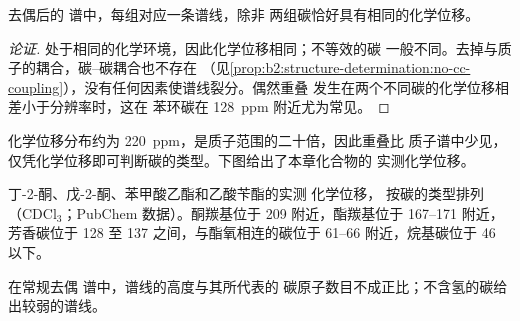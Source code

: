 \begin{proposition}[谱线数目]\label{prop:b2:structure-determination:signals}
去偶后的  谱中，每组对应一条谱线，除非
两组碳恰好具有相同的化学位移。
\end{proposition}

\begin{proof}[论证]
处于相同的化学环境，因此化学位移相同；不等效的碳
一般不同。去掉与质子的耦合，碳–碳耦合也不存在
（见\cref{prop:b2:structure-determination:no-cc-coupling}），没有任何因素使谱线裂分。偶然重叠
发生在两个不同碳的化学位移相差小于分辨率时，这在
苯环碳在 \qty{128}{ppm} 附近尤为常见。
\end{proof}

化学位移分布约为 \qty{220}{ppm}，是质子范围的二十倍，因此重叠比
质子谱中少见，仅凭化学位移即可判断碳的类型。下图给出了本章化合物的
实测化学位移。

\begin{omfigure}

{\small 丁-2-酮、戊-2-酮、苯甲酸乙酯和乙酸苄酯的实测  化学位移，
按碳的类型排列（CDCl$_3$；PubChem 数据）。酮羰基位于 209 附近，酯羰基位于
167--171 附近，芳香碳位于 128 至 137 之间，与酯氧相连的碳位于
61--66 附近，烷基碳位于 46 以下。}
\end{omfigure}

\begin{proposition}[谱线高度不代表计数]\label{prop:b2:structure-determination:intensities}
在常规去偶  谱中，谱线的高度与其所代表的
碳原子数目不成正比；不含氢的碳给出较弱的谱线。
\end{proposition}

